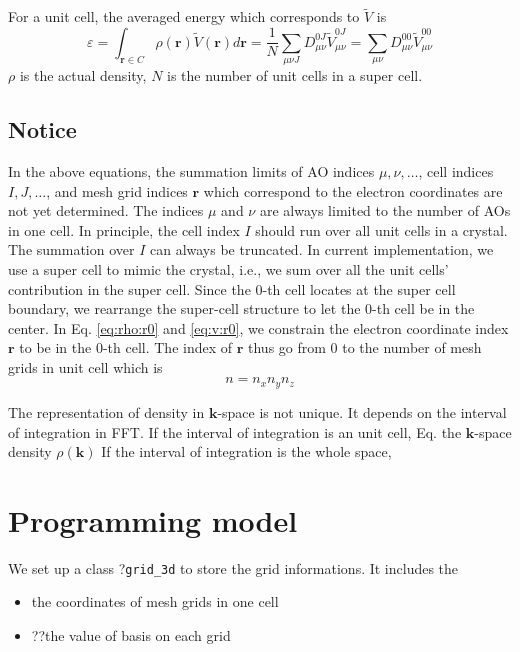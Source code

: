\documentclass{article}
\begin{document}
For a unit cell, the averaged energy which corresponds to $\tilde{V}$ is
\begin{equation}
  \varepsilon = \int_{\mathbf{r}\in C} \rho(\mathbf{r})\tilde{V}(\mathbf{r}) d\mathbf{r}
  = \frac{1}{N}\sum_{\mu\nu J} D_{\mu\nu}^{0J} \tilde{V}_{\mu\nu}^{0J}
  = \sum_{\mu\nu} D_{\mu\nu}^{00} \tilde{V}_{\mu\nu}^{00}
  \label{}
\end{equation}
$\rho$ is the actual density, $N$ is the number of unit cells in a super cell.

\subsection{Notice}
In the above equations, the summation limits of AO indices $\mu,\nu,\dots$,
cell indices $I,J,\dots$, and mesh grid indices $\mathbf{r}$ which correspond
to the electron coordinates are not yet determined.
The indices $\mu$ and $\nu$ are always limited to the number of AOs in one cell.
In principle, the cell index $I$ should run over all unit cells in a
crystal.  The summation over $I$ can always be truncated.
In current implementation, we use a super cell to mimic the crystal,
i.e., we sum over all the unit cells' contribution in the super cell.
Since the 0-th cell locates at the super cell boundary, we rearrange the
super-cell structure to let the 0-th cell be in the center.
In Eq. \eqref{eq:rho:r0} and \eqref{eq:v:r0}, we constrain the electron
coordinate index $\mathbf{r}$ to be in the $0$-th cell.
The index of $\mathbf{r}$ thus go from 0 to the number of mesh grids in unit
cell which is
\begin{equation}
  n = n_x n_y n_z
  \label{}
\end{equation}

The representation of density in $\mathbf{k}$-space is not unique.
It depends on the interval of integration in FFT.
If the interval of integration is an unit cell,
Eq. the $\mathbf{k}$-space density $\rho(\mathbf{k})$
If the interval of integration is the whole space,


\section{Programming model}
We set up a class ?\verb$grid_3d$ to store the
grid informations. It includes the
\begin{itemize}
  \item the coordinates of mesh grids in one cell
  \item ??the value of basis on each grid
\end{itemize}
\end{document}
